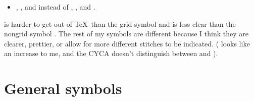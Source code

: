 \documentclass{amsart}
\newif \ifdesigner
\newlength{\symbolcolwidth}
\newlength{\singlecolwidth}
\newlength{\doublecolwidth}
\newcommand{\setcolwidths}[1]{
	\setlength{\symbolcolwidth}{#1}
	\addtolength{\symbolcolwidth}{1pt}
	\setlength{\doublecolwidth}{\textwidth}
	\addtolength{\doublecolwidth}{-4\tabcolsep}
	\addtolength{\doublecolwidth}{-1.2pt} %
	\addtolength{\doublecolwidth}{-\symbolcolwidth}
	\setlength{\singlecolwidth}{0.5\doublecolwidth}
	\addtolength{\singlecolwidth}{-1\tabcolsep}
	\addtolength{\singlecolwidth}{-0.2pt} %
	}
\begin{document}
\begin{fullpages}
\begin{itemize}
\item {}, , and  instead of , , and .

\end{itemize}
is harder to get out of \TeX\ than the grid symbol {\knitgrid\textknit{,}} and is less clear than the nongrid symbol {\knitnogrid\textknit{,}}. The rest of my symbols are different because I think they are clearer, prettier, or allow for more different stitches to be indicated. ( looks like an increase to me, and the CYCA doesn't distinguish between  and ). \fi

\clearpage

\section{General symbols}

\ifdesigner
If you do not use twisted make-1 increases (or if you use \textknit{m}
for them) you may wish to substitute \textknit{t} for \textknit{b}.
If you do use \textknit{t} or \textknit{x}, and you don't care about the
distinction between \textknit{b} and \textknit{q}, you may wish to
substitute \textknit{\knitbox{B}{1}} for \textknit{b}.

\textknit{(} and \textknit{)} are meant to indicate biased stitches, that is, stitches worked between increases and decreases. These are needed in charts for machine knitting; they also can make the chart easier to visualize.


\medskip

\fi

\setcolwidths{\dimen0} %


\end{fullpages}
\end{document}
